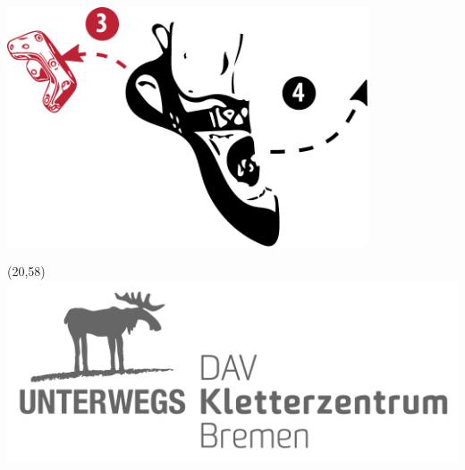 \begin{frame}[plain]
\begin{center}
	\includegraphics[width=0.8\textwidth]{include/images/climbing-shoe-with-instructions-off.pdf}
	\begin{textblock}{60}(20,58)
			\includegraphics[width=\textwidth]{include/images/Logo-Grau.pdf}
	\end{textblock}
\end{center}
\end{frame}
